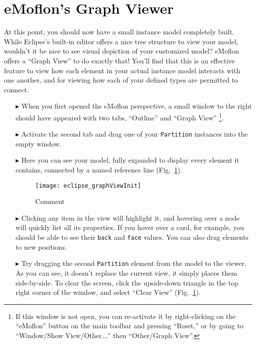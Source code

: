 \newpage
\section{eMoflon's Graph Viewer}
\genHeader
\hypertarget{sec:Graph View}{}

At this point, you should now have a small instance model completely built. While Eclipse's built-in editor offers a nice tree structure to view your model,
wouldn't it be nice to see visual depiction of your customized model? eMoflon offers a ``Graph View'' to do exactly that! You'll find that this is an effective
feature to view how each element in your actual instance model interacts with one another, and for viewing how each of your defined types are permitted to connect.

\begin{itemize}

\item[$\blacktriangleright$] When you first opened the eMoflon perspective, a small window to the right should have appeared with two tabs, ``Outline'' and
``Graph View'' \footnote{If this window is not open, you can re-activate it by right-clicking on the ``eMoflon'' button on the main toolbar and pressing
``Reset,'' or by going to ``Window/Show View/Other..,'' then ``Other/Graph View''.}. 

\item[$\blacktriangleright$] Activate the second tab and drag one of your \texttt{Partition} instances into the empty window. 

\item[$\blacktriangleright$] Here you can see your model, fully expanded to display every element it contains, connected by a named reference line
(Fig.~\ref{fig:graphView_init}).

\begin{figure}[htbp]
	\centering
  \texttt{[image: eclipse\_graphViewInit]}
	\caption{Comment}
	\label{fig:graphView_init}
\end{figure}

\item[$\blacktriangleright$] Clicking any item in the view will highlight it, and hovering over a node will quickly list all its properties. If you hover
over a card, for example, you should be able to see their \texttt{back} and \texttt{face} values. You can also drag elements to new positions.

\clearpage

\item[$\blacktriangleright$] Try dragging the second \texttt{Partition} element from the model to the viewer. As you can see, it doesn't replace the current
view, it simply places them side-by-side. To clear the screen, click the upside-down triangle in the top right corner of the window, and select ``Clear View''
(Fig.~\ref{fig:graphView_init}).


\end{itemize}
